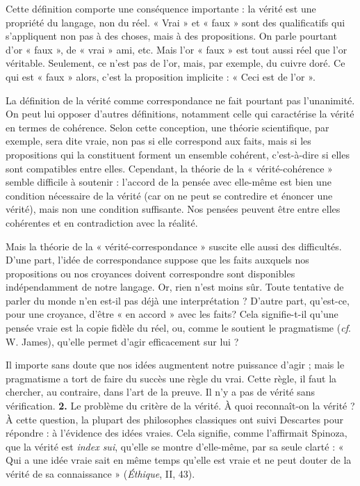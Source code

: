 Cette définition comporte une conséquence
importante : la vérité est une propriété
du langage, non du réel. « Vrai » et
« faux » sont des qualificatifs qui s’appliquent
non pas à des choses, mais à des
propositions. On parle pourtant d'or
« faux », de « vrai » ami, etc. Mais l'or
« faux » est tout aussi réel que l'or véritable.
Seulement, ce n'est pas de l'or,
mais, par exemple, du cuivre doré. Ce qui
est « faux » alors, c'est la proposition
implicite : « Ceci est de l'or ».

La définition de la vérité comme correspondance
ne fait pourtant pas l’unanimité.
On peut lui opposer d’autres définitions,
notamment celle qui caractérise la
vérité en termes de cohérence. Selon
cette conception, une théorie scientifique,
par exemple, sera dite vraie, non pas si
elle correspond aux faits, mais si les propositions
qui la constituent forment un
ensemble cohérent, c'est-à-dire si elles
sont compatibles entre elles. Cependant,
la théorie de la « vérité-cohérence »
semble difficile à soutenir : l'accord de la
pensée avec elle-même est bien une
condition nécessaire de la vérité (car on
ne peut se contredire et énoncer une
vérité), mais non une condition suffisante.
Nos pensées peuvent être entre elles
cohérentes et en contradiction avec la
réalité.

Mais la théorie de la « vérité-correspondance »
suscite elle aussi des difficultés.
D'une part, l’idée de correspondance
suppose que les faits auxquels nos propositions
ou nos croyances doivent correspondre
sont disponibles indépendamment
de notre langage. Or, rien n'est
moins sûr. Toute tentative de parler du
monde n’en est-il pas déjà une interprétation ?
D'autre part, qu'est-ce, pour une
croyance, d’être « en accord » avec les
faits? Cela signifie-t-il qu’une pensée
vraie est la copie fidèle du réel, ou,
comme le soutient le pragmatisme ({\it cf}.
W. James), qu’elle permet d'agir efficacement
sur lui ?

Il importe sans doute que nos idées
augmentent notre puissance d'agir ; mais
le pragmatisme a tort de faire du succès
une règle du vrai. Cette règle, il faut la
chercher, au contraire, dans l’art de la
preuve. Il n’y a pas de vérité sans vérification.
{\bf 2.} Le problème du critère de la vérité. À
quoi reconnaît-on la vérité ? À cette question,
la plupart des philosophes classiques
ont suivi Descartes pour
répondre : à l’évidence des idées vraies.
Cela signifie, comme l’affirmait Spinoza,
que la vérité est {\it index sui}, qu'elle se
montre d'elle-même, par sa seule clarté :
« Qui a une idée vraie sait en même
temps qu'elle est vraie et ne peut douter
de la vérité de sa connaissance » ({\it Éthique},
II, 43).

